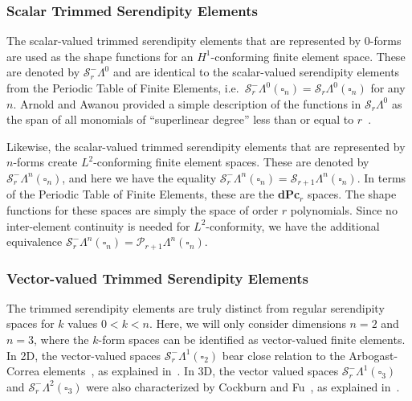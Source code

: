 \documentclass[format=acmsmall,screen,timestamp=false,a4paper]{acmart}
\newcommand{\calP}{\mathcal{P}}
\newcommand{\calS}{\mathcal{S}}
\begin{document}
	
	
  
  
  \subsubsection{Scalar Trimmed Serendipity Elements}
  The scalar-valued trimmed serendipity elements that are represented by $0$-forms are used as the shape functions for an $H^1$-conforming finite element space.  These are denoted by $\calS_r^-\Lambda^0$ and are identical to the scalar-valued serendipity elements from the Periodic Table of Finite Elements, i.e.\ $\calS_r^-\Lambda^0(\square_n) = \calS_r\Lambda^0(\square_n)$ for any $n$.  Arnold and Awanou provided a simple description of the functions in $\mathcal{S}_r\Lambda^0$ as the span of all monomials of ``superlinear degree'' less than or equal to $r$~\cite{arnold2011serendipity}. 
  
  Likewise, the scalar-valued trimmed serendipity elements that are represented by $n$-forms create $L^2$-conforming finite element spaces.  These are denoted by $\calS_r^-\Lambda^n(\square_n)$, and here we have the equality $\calS_r^-\Lambda^n(\square_n) = \calS_{r+1}\Lambda^n(\square_n)$.  In terms of the Periodic Table of Finite Elements, these are the \textbf{dPc}$_r$ spaces.  The shape functions for these spaces are simply the space of order $r$ polynomials.  Since no inter-element continuity is needed for $L^2$-conformity, we have the additional equivalence $\calS_r^-\Lambda^n(\square_n) = \calP_{r+1}\Lambda^n(\square_n)$.
  
  \subsubsection{Vector-valued Trimmed Serendipity Elements}
  

	The trimmed serendipity elements are truly distinct from regular serendipity spaces for $k$ values $0<k<n$.  Here, we will only consider dimensions $n=2$ and $n=3$, where the $k$-form spaces can be identified as vector-valued finite elements.  	
	In 2D, the vector-valued spaces $\calS_r^-\Lambda^1(\square_2)$ bear close relation to the Arbogast-Correa elements~\citep{arbogast2016two}, as explained in~\cite[Prop 2.2]{gillette2019trimmed}.
	In 3D, the vector valued spaces $\calS_r^-\Lambda^1(\square_3)$ and $\calS_r^-\Lambda^2(\square_3)$ were also characterized by Cockburn and Fu~\cite{CF2016}, as explained in~\cite[Prop 2.3]{gillette2019trimmed}.
\end{document}
